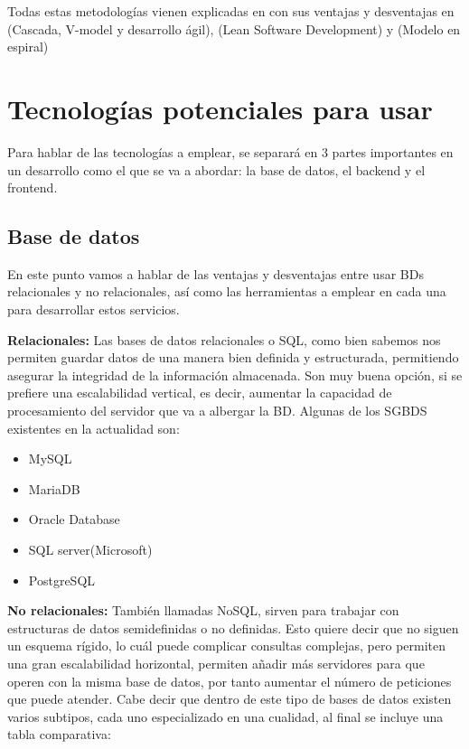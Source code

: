 Todas estas metodologías vienen explicadas en con sus ventajas y desventajas en \cite{anwer2017sdlc} (Cascada, V-model y desarrollo ágil), \cite{poppendieck2012lean} (Lean Software Development) y \cite{boehm1988spiral} (Modelo en espiral)

\section{Tecnologías potenciales para usar}

Para hablar de las tecnologías a emplear, se separará en 3 partes importantes en un desarrollo como el que se va a abordar: la base de datos, el backend y el frontend.

\subsection{Base de datos}

En este punto vamos a hablar de las ventajas y desventajas entre usar BDs relacionales y no relacionales, así como las herramientas a emplear en cada una para desarrollar estos servicios.

\textbf{Relacionales:} Las bases de datos relacionales o SQL, como bien sabemos nos permiten guardar datos de una manera bien definida y estructurada, permitiendo asegurar la integridad de la información almacenada. Son muy buena opción, si se prefiere una escalabilidad vertical, es decir, aumentar la capacidad de procesamiento del servidor que va a albergar la BD. Algunas de los SGBDS existentes en la actualidad son:

\begin{itemize}
	\item MySQL
	\item MariaDB
	\item Oracle Database
	\item SQL server(Microsoft)
	\item PostgreSQL
\end{itemize}

\textbf{No relacionales:} También llamadas NoSQL, sirven para trabajar con estructuras de datos semidefinidas o no definidas. Esto quiere decir que no siguen un esquema rígido, lo cuál puede complicar consultas complejas, pero permiten una gran escalabilidad horizontal, permiten añadir más servidores para que operen con la misma base de datos, por tanto aumentar el número de peticiones que puede atender. Cabe decir que dentro de este tipo de bases de datos existen varios subtipos, cada uno especializado en una cualidad, al final se incluye una tabla comparativa:

